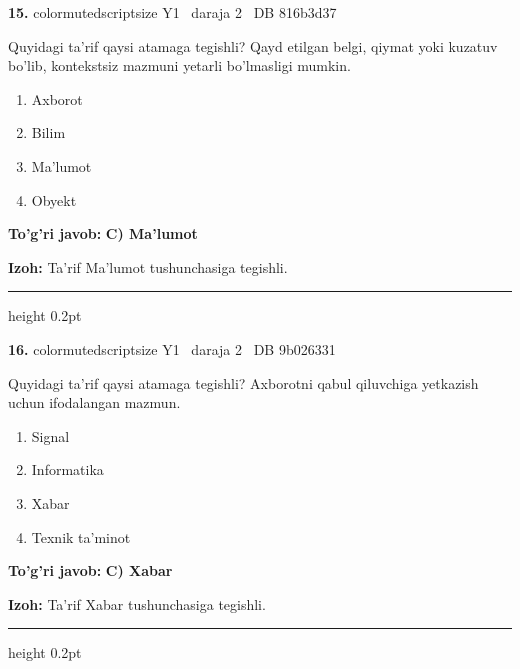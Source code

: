 \documentclass[10pt,a4paper,oneside]{article}
\begin{document}
\noindent\textbf{\color{ink}15.}  {color{muted}scriptsize Y1 \textbullet\ daraja 2 \textbullet\ DB 816b3d37}
\par
Quyidagi ta'rif qaysi atamaga tegishli? Qayd etilgan belgi, qiymat yoki kuzatuv bo'lib, kontekstsiz mazmuni yetarli bo'lmasligi mumkin.
\begin{enumerate}[label=\Alph*),leftmargin=9mm]
\item Axborot
\item Bilim
\item Ma'lumot
\item Obyekt
\end{enumerate}
\begin{tcolorbox}[enhanced,breakable,colback=teal!4,colframe=teal!50!black,boxrule=0.5pt,arc=1.1mm,left=3mm,right=3mm,top=1.7mm,bottom=1.7mm,before skip=2mm,after skip=2mm]
\textbf{\color{teal}To'g'ri javob:} \textbf{C) Ma'lumot}
\par\smallskip
\textbf{Izoh:} Ta'rif Ma'lumot tushunchasiga tegishli.
\end{tcolorbox}
\vspace{2mm}\hrule height 0.2pt \vspace{3mm}

\noindent\textbf{\color{ink}16.}  {color{muted}scriptsize Y1 \textbullet\ daraja 2 \textbullet\ DB 9b026331}
\par
Quyidagi ta'rif qaysi atamaga tegishli? Axborotni qabul qiluvchiga yetkazish uchun ifodalangan mazmun.
\begin{enumerate}[label=\Alph*),leftmargin=9mm]
\item Signal
\item Informatika
\item Xabar
\item Texnik ta'minot
\end{enumerate}
\begin{tcolorbox}[enhanced,breakable,colback=teal!4,colframe=teal!50!black,boxrule=0.5pt,arc=1.1mm,left=3mm,right=3mm,top=1.7mm,bottom=1.7mm,before skip=2mm,after skip=2mm]
\textbf{\color{teal}To'g'ri javob:} \textbf{C) Xabar}
\par\smallskip
\textbf{Izoh:} Ta'rif Xabar tushunchasiga tegishli.
\end{tcolorbox}
\vspace{2mm}\hrule height 0.2pt \vspace{3mm}
\end{document}
